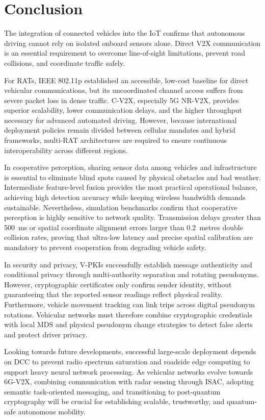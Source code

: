 \section{Conclusion}
\label{sec:conclusion}

The integration of connected vehicles into the IoT confirms that autonomous driving cannot rely on isolated onboard sensors alone.
Direct V2X communication is an essential requirement to overcome line-of-sight limitations, prevent road collisions, and coordinate traffic safely.

For RATs, IEEE 802.11p established an accessible, low-cost baseline for direct vehicular communications, but its uncoordinated channel access suffers from severe packet loss in dense traffic.
C-V2X, especially 5G NR-V2X, provides superior scalability, lower communication delays, and the higher throughput necessary for advanced automated driving.
However, because international deployment policies remain divided between cellular mandates and hybrid frameworks, multi-RAT architectures are required to ensure continuous interoperability across different regions.

In cooperative perception, sharing sensor data among vehicles and infrastructure is essential to eliminate blind spots caused by physical obstacles and bad weather.
Intermediate feature-level fusion provides the most practical operational balance, achieving high detection accuracy while keeping wireless bandwidth demands sustainable.
Nevertheless, simulation benchmarks confirm that cooperative perception is highly sensitive to network quality.
Transmission delays greater than 500~ms or spatial coordinate alignment errors larger than 0.2~metres double collision rates, proving that ultra-low latency and precise spatial calibration are mandatory to prevent cooperation from degrading vehicle safety.

In security and privacy, V-PKIs successfully establish message authenticity and conditional privacy through multi-authority separation and rotating pseudonyms.
However, cryptographic certificates only confirm sender identity, without guaranteeing that the reported sensor readings reflect physical reality.
Furthermore, vehicle movement tracking can link trips across digital pseudonym rotations.
Vehicular networks must therefore combine cryptographic credentials with local MDS and physical pseudonym change strategies to detect false alerts and protect driver privacy.

Looking towards future developments, successful large-scale deployment depends on DCC to prevent radio spectrum saturation and roadside edge computing to support heavy neural network processing.
As vehicular networks evolve towards 6G-V2X, combining communication with radar sensing through ISAC, adopting semantic task-oriented messaging, and transitioning to post-quantum cryptography will be crucial for establishing scalable, trustworthy, and quantum-safe autonomous mobility.